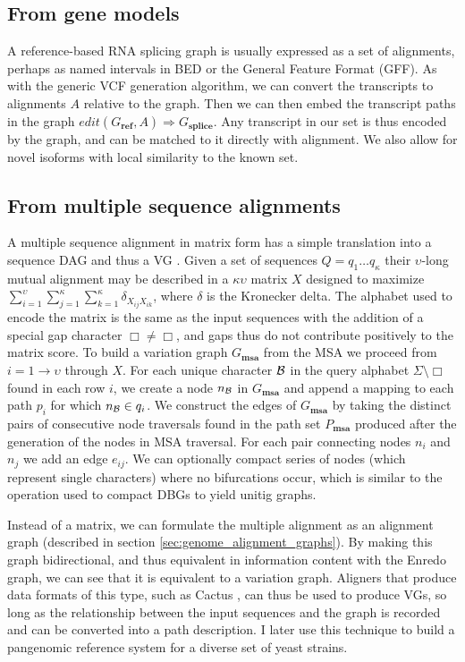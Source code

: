 \subsection{From gene models} %

A reference-based RNA splicing graph is usually expressed as a set of alignments, perhaps as named intervals in BED or the General Feature Format (GFF).
As with the generic VCF generation algorithm, we can convert the transcripts to alignments $A$ relative to the graph.
Then we can then embed the transcript paths in the graph $edit(G_\textbf{ref}, A) \Rightarrow G_\textbf{splice}$.
Any transcript in our set is thus encoded by the graph, and can be matched to it directly with alignment.
We also allow for novel isoforms with local similarity to the known set.

\subsection{From multiple sequence alignments}
A multiple sequence alignment in matrix form has a simple translation into a sequence DAG and thus a VG \cite{lee2002POA}.
Given a set of sequences $Q = q_1 \ldots q_\kappa$ their $\upsilon$-long mutual alignment may be described in a $\kappa \upsilon$ matrix $X$ designed to maximize $\sum_{i=1}^{\upsilon} \sum_{j=1}^{\kappa} \sum_{k=1}^{\kappa} \delta_{X_{ij}X_{ik}}$, where $\delta$ is the Kronecker delta.
The alphabet used to encode the matrix is the same as the input sequences with the addition of a special gap character $\Box \neq \Box$, and gaps thus do not contribute positively to the matrix score.
To build a variation graph $G_\textbf{msa}$ from the MSA we proceed from $i = 1 \to \upsilon$ through $X$.
For each unique character ${\cal B}$ in the query alphabet $\Sigma \setminus \Box$ found in each row $i$, we create a node $n_{\cal B}$ in $G_\textbf{msa}$ and append a mapping to each path $p_i$ for which $n_{\cal B} \in q_i$.
We construct the edges of $G_\textbf{msa}$ by taking the distinct pairs of consecutive node traversals found in the path set $P_\textbf{msa}$ produced after the generation of the nodes in MSA traversal.
For each pair connecting nodes $n_i$ and $n_j$ we add an edge $e_{ij}$.
We can optionally compact series of nodes (which represent single characters) where no bifurcations occur, which is similar to the operation used to compact DBGs to yield unitig graphs.

Instead of a matrix, we can formulate the multiple alignment as an alignment graph (described in section \ref{sec:genome_alignment_graphs}).
By making this graph bidirectional, and thus equivalent in information content with the Enredo graph, we can see that it is equivalent to a variation graph.
Aligners that produce data formats of this type, such as Cactus \cite{Paten:2011fva}, can thus be used to produce VGs, so long as the relationship between the input sequences and the graph is recorded and can be converted into a path description.
I later use this technique to build a pangenomic reference system for a diverse set of yeast strains.

